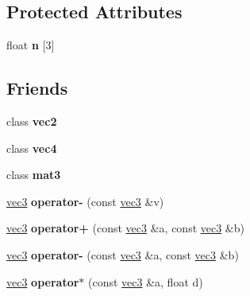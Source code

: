 \subsection*{Protected Attributes}
\begin{DoxyCompactItemize}
\item 
\hypertarget{classvec3_a038e40ea01c44cc5184082f8dc17994c}{float {\bfseries n} \mbox{[}3\mbox{]}}\label{classvec3_a038e40ea01c44cc5184082f8dc17994c}

\end{DoxyCompactItemize}
\subsection*{Friends}
\begin{DoxyCompactItemize}
\item 
\hypertarget{classvec3_a15a2529e420e1a5cb94508d6a5a57d1e}{class {\bfseries vec2}}\label{classvec3_a15a2529e420e1a5cb94508d6a5a57d1e}

\item 
\hypertarget{classvec3_aa6e6ead6159bde48f1607d4208122d9d}{class {\bfseries vec4}}\label{classvec3_aa6e6ead6159bde48f1607d4208122d9d}

\item 
\hypertarget{classvec3_a036449d0093edd0ad304c94ce9eeb531}{class {\bfseries mat3}}\label{classvec3_a036449d0093edd0ad304c94ce9eeb531}

\item 
\hypertarget{classvec3_ad57f6a85dd0416a336c6d6bbbfdf5441}{\hyperlink{classvec3}{vec3} {\bfseries operator-\/} (const \hyperlink{classvec3}{vec3} \&v)}\label{classvec3_ad57f6a85dd0416a336c6d6bbbfdf5441}

\item 
\hypertarget{classvec3_a5d7987568bb8292df33b422665fd73f8}{\hyperlink{classvec3}{vec3} {\bfseries operator+} (const \hyperlink{classvec3}{vec3} \&a, const \hyperlink{classvec3}{vec3} \&b)}\label{classvec3_a5d7987568bb8292df33b422665fd73f8}

\item 
\hypertarget{classvec3_a8bc7975c3f566dfa7410c96d8d91f52f}{\hyperlink{classvec3}{vec3} {\bfseries operator-\/} (const \hyperlink{classvec3}{vec3} \&a, const \hyperlink{classvec3}{vec3} \&b)}\label{classvec3_a8bc7975c3f566dfa7410c96d8d91f52f}

\item 
\hypertarget{classvec3_a6d01c72683b3bfed64d4be3c9f185e54}{\hyperlink{classvec3}{vec3} {\bfseries operator$\ast$} (const \hyperlink{classvec3}{vec3} \&a, float d)}\label{classvec3_a6d01c72683b3bfed64d4be3c9f185e54}


\end{DoxyCompactItemize}
